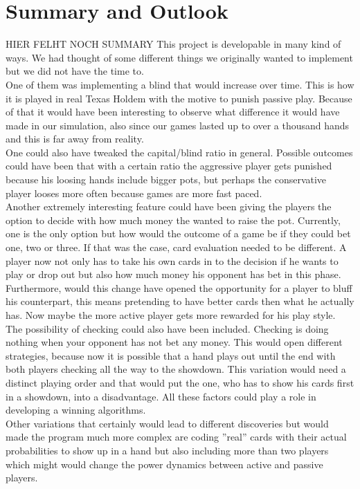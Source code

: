 \documentclass[11pt]{article}
\begin{document}
\section{Summary and Outlook}
HIER FELHT NOCH SUMMARY This project is developable in many kind of ways. We had thought of some different things we originally wanted to implement but we did not have the time to. \\
One of them was implementing a blind that would increase over time. This is how it is played in real Texas Holdem with the motive to punish passive play. Because of that it would have been interesting to observe what difference it would have made in our simulation, also since our games lasted up to over a thousand hands and this is far away from reality. \\
One could also have tweaked the capital/blind ratio in general. Possible outcomes could have been that with a certain ratio the aggressive player gets punished because his loosing hands include bigger pots, but perhaps the conservative player looses more often because games are more fast paced.\\
Another extremely interesting feature could have been giving the players the option to decide with how much money the wanted to raise the pot. Currently, one is the only option but how would the outcome of a game be if they could bet one, two or three. If that was the case, card evaluation needed to be different. A player now not only has to take his own cards in to the decision if he wants to play or drop out but also how much money his opponent has bet in this phase. Furthermore, would this change have opened the opportunity for a player to bluff his counterpart, this means pretending to have better cards then what he actually has. Now maybe the more active player gets more rewarded for his play style.\\
The possibility of checking could also have been included. Checking is doing nothing when your opponent has not bet any money. This would open different strategies, because now it is possible that a hand plays out until the end with both players checking all the way to the showdown. This variation would need a distinct playing order and that would put the one, who has to show his cards first in a showdown, into a disadvantage. All these factors could play a role in developing a winning algorithms.\\
Other variations that certainly would lead to different discoveries but would made the program much more complex are coding ''real'' cards with their actual probabilities to show up in a hand but also including more than two players which might would change the power dynamics between active and passive players.
\end{document}

